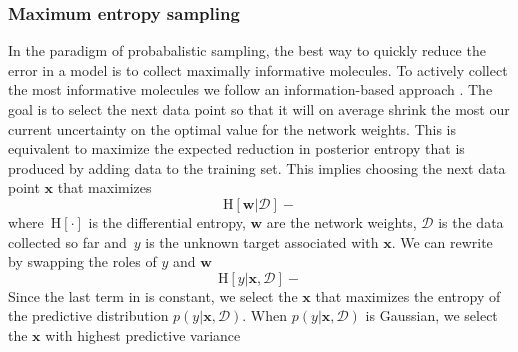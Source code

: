 \subsubsection{Maximum entropy sampling}

In the paradigm of probabalistic sampling, the best way to quickly reduce the error in a model is to collect maximally informative molecules. To actively collect the most informative molecules we follow an information-based approach \cite{MacKay_1992}. The goal
is to select the next data point so that it will on average shrink the most our current uncertainty on the optimal value for the network weights. This is equivalent to maximize the expected reduction in posterior entropy that is produced by adding data to the training set. This implies choosing the next data point $\mathbf{x}$ that maximizes
\begin{equation}
\text{H}[\mathbf{w}|\mathcal{D}] - 
\end{equation}
where~$\text{H}[\cdot]$ is the differential entropy, $\mathbf{w}$ are the network weights, $\mathcal{D}$ is the data collected so far and~$y$ is the unknown target associated with $\mathbf{x}$. We can rewrite  by swapping the roles of $y$ and $\mathbf{w}$ %
\begin{equation}
\text{H}[y | \mathbf{x},\mathcal{D}] - 
\end{equation}
Since the last term in is constant, we select the $\mathbf{x}$ that maximizes the entropy of the predictive distribution $p(y| \mathbf{x},\mathcal{D})$. When $p(y| \mathbf{x},\mathcal{D})$ is Gaussian, we select the $\mathbf{x}$ with highest predictive variance